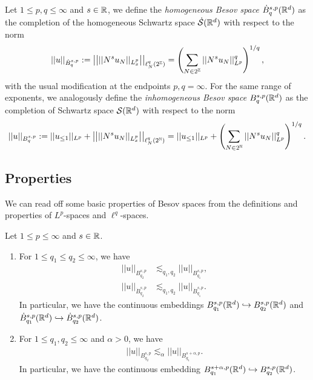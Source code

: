 Let $1 \leq p, q \leq \infty$ and $s \in \mathbb R$, we define the \emph{homogeneous Besov space} $\dot B^{s, p}_q (\mathbb R^d)$ as the completion of the homogeneous Schwartz space $\dot {\mathcal S} (\mathbb R^d)$ with respect to the norm 
	\[ ||u||_{\dot B^{s, p}_q} := \left|\left| || N^s u_N ||_{L^p_x} \right|\right|_{\ell^q_N (2^\mathbb Z)} =  \left( \sum_{N \in 2^\mathbb Z} || N^s u_N ||_{L^p}^q \right)^{1/q}, \]
with the usual modification at the endpoints $p, q = \infty$. For the same range of exponents, we analogously define the \emph{inhomogeneous Besov space} $B^{s, p}_q (\mathbb R^d)$ as the completion of Schwartz space $\mathcal S (\mathbb R^d)$ with respect to the norm 
	\[ ||u||_{B^{s, p}_q} := ||u_{\leq 1}||_{L^p} + \left|\left| || N^s u_N ||_{L^p_x} \right|\right|_{\ell^q_N (2^\mathbb N)} =  ||u_{\leq 1}||_{L^p} + \left( \sum_{N \in 2^\mathbb N} || N^s u_N ||_{L^p}^q \right)^{1/q}.\]

\subsection{Properties}

We can read off some basic properties of Besov spaces from the definitions and properties of $L^p$-spaces and $\ell^q$-spaces. 

\begin{proposition}
	Let $1 \leq p \leq \infty$ and $s \in \mathbb R$. 
\begin{enumerate}
	\item For $1 \leq q_1 \leq q_2 \leq \infty$, we have
			\begin{align*}
				||u||_{B^{s, p}_{q_2}} 
					&\lesssim_{q_1, q_2} ||u||_{B^{s, p}_{q_1}},\\
				||u||_{\dot B^{s, p}_{q_2}} 
					&\lesssim_{q_1, q_2} ||u||_{\dot B^{s, p}_{q_1}}.
			\end{align*}
		In particular, we have the continuous embeddings $B^{s, p}_{q_1} (\mathbb R^d) \hookrightarrow B^{s, p}_{q_2} (\mathbb R^d)$ and $\dot B^{s, p}_{q_1} (\mathbb R^d) \hookrightarrow \dot B^{s, p}_{q_2} (\mathbb R^d)$. 
	
	\item For $1 \leq q_1, q_2 \leq \infty$ and $\alpha > 0$, we have
			\begin{align*}
				||u||_{B^{s, p}_{q_2}} \lesssim_\alpha ||u||_{B^{s + \alpha, p}_{q_1}}.
			\end{align*}
		In particular, we have the continuous embedding $B^{s + \alpha, p}_{q_1} (\mathbb R^d) \hookrightarrow B^{s, p}_{q_2} (\mathbb R^d)$.
		
\end{enumerate}\label{prop:basicembedbesov}	
\end{proposition}

